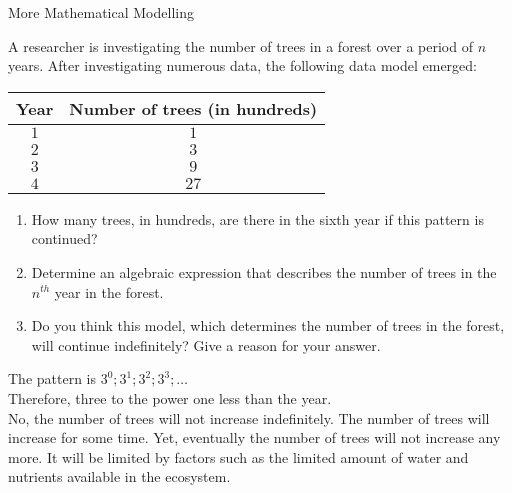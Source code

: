 \begin{wex}{More Mathematical Modelling}
{A researcher is investigating the number of trees in a forest over a period of $n$ years. After investigating numerous data, the following data model emerged:
\begin{center}
\begin{tabular}{|c|c|}\hline
Year& Number of trees (in hundreds)\\\hline
$1$ & $1$\\\hline
$2$ & $3$ \\\hline
$3$ & $9$ \\\hline
$4$ & $27$ \\\hline
\end{tabular}
\end{center}
\begin{enumerate}
\item{How many trees, in hundreds, are there in the sixth year if this pattern is
continued?}
\item{Determine an algebraic expression that describes the number of trees in the $n^{th}$ year in the forest.}
\item{Do you think this model, which determines the number of trees in the forest, will continue indefinitely? Give a reason for your answer.}
\end{enumerate}
}{
The pattern is $3^0; 3^1; 3^2; 3^3;\ldots$\\
Therefore, three to the power one less than the year.\\
No, the number of trees will not increase indefinitely. The number of trees will increase for some time. Yet, eventually the number of trees will not increase any more. It will be limited by factors such as the limited amount of water and nutrients available in the ecosystem.
}
\end{wex}

